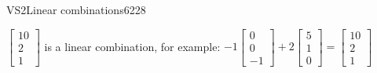 \begin{exercise}{VS2}{Linear combinations}{6228}
\begin{exerciseAnswer}
\begin{itemize}
 \(\left[\begin{array}{c}
10 \\
2 \\
1
\end{array}\right]\) is a linear combination, for example: \(
-1 \left[\begin{array}{c}
0 \\
0 \\
-1
\end{array}\right] + 2 \left[\begin{array}{c}
5 \\
1 \\
0
\end{array}\right] = \left[\begin{array}{c}
10 \\
2 \\
1
\end{array}\right]
                            \) 

 
\end{itemize}

     \end{exerciseAnswer}
 \end{exercise}


